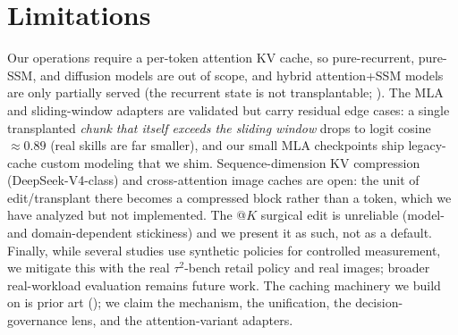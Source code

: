 \section{Limitations}
\label{sec:limitations}

Our operations require a per-token attention KV cache, so pure-recurrent, pure-SSM, and diffusion models
are out of scope, and hybrid attention+SSM models are only partially served (the recurrent state is not
transplantable; ). The MLA and sliding-window adapters are validated but carry residual
edge cases: a single transplanted \emph{chunk that itself exceeds the sliding window} drops to logit cosine
$\approx 0.89$ (real skills are far smaller), and our small MLA checkpoints ship legacy-cache custom
modeling that we shim. Sequence-dimension KV compression (DeepSeek-V4-class) and cross-attention image
caches are open: the unit of edit/transplant there becomes a compressed block rather than a token, which we
have analyzed but not implemented. The \fieldsel{}@$K$ surgical edit is unreliable (model- and
domain-dependent stickiness) and we present it as such, not as a default. Finally, while several studies use
synthetic policies for controlled measurement, we mitigate this with the real \(\tau^2\)-bench retail policy
and real images; broader real-workload evaluation remains future work. The caching machinery we build on is
prior art (); we claim the mechanism, the unification, the decision-governance lens, and
the attention-variant adapters.
